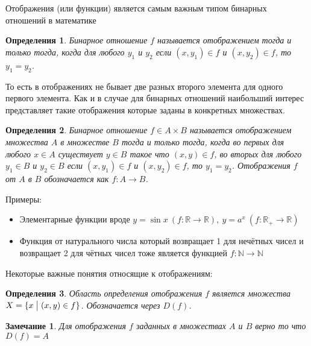\documentclass[a4paper, 16pt, oneside]{book}
\newtheorem{Definition}{Определения}[theorem]
\newtheorem{Note}{Замечание}[theorem]
\begin{document}
\par Отображения (или функции) является самым важным типом бинарных отношений в математике

\begin{Definition}
    \label{definiton:function}
    Бинарное отношение \(f\) называется отображением тогда и только тогда, когда для любого  \(y_1\) и \(y_2\) если \((x, y_1) \in f\) и \((x, y_2) \in f\), то \(y_1 = y_2\).
\end{Definition}

\par То есть в отображениях не бывает две разных второго элемента для одного первого элемента.
Как и в случае для бинарных отношений наибольший интерес представляет такие отображения которые заданы в конкретных множествах.

\begin{Definition}
    \label{definiton:function_in_sets}
    Бинарное отношение \(f \in A \times B\) называется отображением множества \(A\) в множестве \(B\) тогда и только тогда,
    когда во первых для любого \(x \in A\) существует \(y \in B\) такое что \((x, y) \in f\),
    во вторых для любого \(y_1 \in B\) и \(y_2 \in B\) если \((x, y_1) \in f\) и \((x, y_2) \in f\), то \(y_1 = y_2\).
    Отображения \(f\) от \(A\) в \(B\) обозначается как \(f: A \rightarrow B\).
\end{Definition}

\par Примеры:
\begin{itemize}
    \item Элементарные функции вроде \({y = \sin{x}\ (f: \mathbb{R} \rightarrow \mathbb{R}),\ y = a ^ x\ (f: \mathbb{R_{+}} \rightarrow \mathbb{R})}\)
    \item Функция от натурального числа который возвращает 1 для нечётных чисел и возвращает 2 для чётных чисел тоже является функцией 
    \({f: \mathbb{N} \rightarrow \mathbb{N}}\)
\end{itemize}

\par Некоторые важные понятия относящие к отображениям:
\begin{Definition}
	\label{definition:function_domain}
	Область определения отображения \(f\) является множества \(X = \{x \bigm| (x, y) \in f\}\). Обозначается через \(D(f)\).
\end{Definition}

\begin{Note}
	\label{note:A_is_equal_D(f)}
	Для отображения \(f\) заданных в множествах \(A\) и \(B\) верно то что \(D(f) = A\)
\end{Note}
\end{document}
